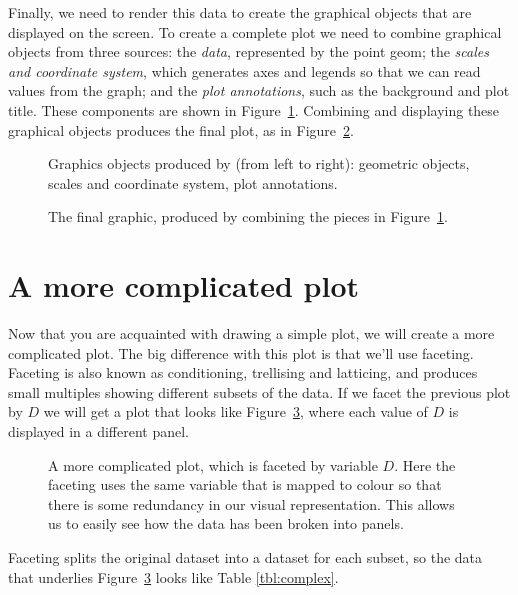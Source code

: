 Finally, we need to render this data to create the graphical objects that are displayed on the screen.  To create a complete plot we need to combine graphical objects from three sources: the \emph{data}, represented by the point geom; the \emph{scales and coordinate system}, which generates axes and legends so that we can read values from the graph; and the \emph{plot annotations}, such as the background and plot title.  These components are shown in Figure~\ref{fig:simple-exploded}.  Combining and displaying these graphical objects produces the final plot, as in Figure~\ref{fig:simple}.

\begin{figure}[htbp]
  \centering
  \caption{Graphics objects produced by (from left to right): geometric objects, scales and coordinate system, plot annotations.}
  \label{fig:simple-exploded}
\end{figure}

\begin{figure}[htbp]
  \centering
  \caption{The final graphic, produced by combining the pieces in Figure~\ref{fig:simple-exploded}.}
  \label{fig:simple}
\end{figure}

\section{A more complicated plot}\label{sec:how_to_build_a_more_complicated_plot} 

Now that you are acquainted with drawing a simple plot, we will create a more complicated plot.  The big difference with this plot is that we'll use faceting.  Faceting is also known as conditioning, trellising and latticing, and produces small multiples showing different subsets of the data.  If we facet the previous plot by $D$ we will get a plot that looks like Figure~\ref{fig:complex}, where each value of $D$ is displayed in a different panel.

\begin{figure}[htbp]
  \centering
  \caption{A more complicated plot, which is faceted by variable $D$.  Here the faceting uses the same variable that is mapped to colour so that there is some redundancy in our visual representation.  This allows us to easily see how the data has been broken into panels.}
  \label{fig:complex}
\end{figure}

Faceting splits the original dataset into a dataset for each subset, so the data that underlies Figure~\ref{fig:complex} looks like Table \ref{tbl:complex}.

